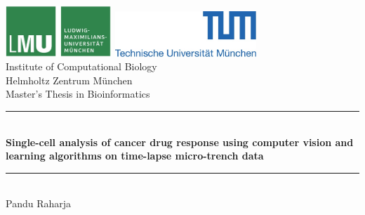 \documentclass[pdftex,12pt,a4paper]{report}
\newcommand{\HRule}{\rule{\linewidth}{0.5mm}}
\begin{document}
\begin{titlepage}

\sffamily

\begin{center}


\includegraphics[width=0.3\textwidth]{logo2.jpg}
\hfill
\includegraphics[width=0.4\textwidth]{logo1.jpg}  
\\[5cm]

{\Huge Institute of Computational Biology}\\[0.5cm]
{\Huge Helmholtz Zentrum M\"unchen}\\[1cm]

{\Huge Master's Thesis in Bioinformatics}\\[1.5cm]

\HRule \\[0.4cm]
{ \huge \bfseries Single-cell analysis of cancer drug response using computer vision and learning algorithms on time-lapse micro-trench data}\\[0.4cm]

\HRule \\[1.5cm]

{\Huge Pandu Raharja}\\[2.5cm]

\vfill
\end{center}
\end{titlepage}
\end{document}
